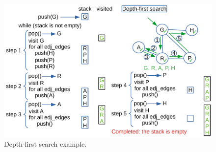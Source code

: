 \begin{figure}[H]
	\begin{center}
		\includegraphics[scale=.6]{chapters/appendix/images/appendixgraphs/graphsappendix_1.pdf}
		\caption[Depth-first search example.]{Depth-first search example.}
		\label{graphappendix_1}
	\end{center}
\end{figure}

